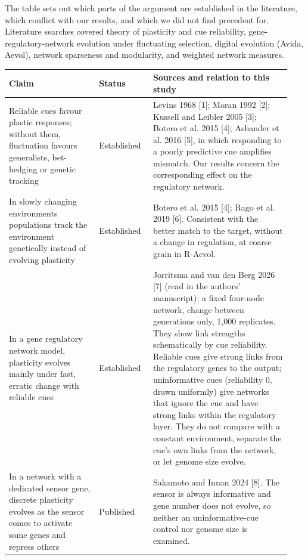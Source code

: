 


The table sets out which parts of the argument are established in the
literature, which conflict with our results, and which we did not find
precedent for. Literature searches covered theory of plasticity and cue
reliability, gene-regulatory-network evolution under fluctuating selection,
digital evolution (Avida, Aevol), network sparseness and modularity, and weighted
network measures.

\begin{longtable}{@{}p{0.3\linewidth}p{0.18\linewidth}p{0.46\linewidth}@{}}
\toprule
Claim & Status & Sources and relation to this study\\
\midrule
\endhead
Reliable cues favour plastic responses; without them, fluctuation favours
generalists, bet-hedging or genetic tracking & Established &
Levins 1968 [1]; Moran 1992 [2]; Kussell and Leibler 2005 [3]; Botero et al.
2015 [4]; Ashander et al. 2016 [5], in which responding to a poorly predictive
cue amplifies mismatch. Our results concern the corresponding effect on the
regulatory network.\\
In slowly changing environments populations track the environment genetically
instead of evolving plasticity & Established & Botero et al. 2015 [4]; Rago et al.
2019 [6]. Consistent with the better match to the target, without a change in
regulation, at coarse grain in R-Aevol.\\
In a gene regulatory network model, plasticity evolves mainly under fast, erratic
change with reliable cues & Established & Jorritsma and van den Berg 2026 [7]
(read in the authors' manuscript): a fixed four-node network, change between
generations only, 1,000 replicates. They show link strengths schematically by cue
reliability. Reliable cues give strong links from the regulatory genes to the
output; uninformative cues (reliability 0, drawn uniformly) give networks that
ignore the cue and have strong links within the regulatory layer. They do not
compare with a constant environment, separate the cue's own links from the
network, or let genome size evolve.\\
In a network with a dedicated sensor gene, discrete plasticity evolves as the
sensor comes to activate some genes and repress others & Published & Sakamoto and
Innan 2024 [8]. The sensor is always informative and gene number does not
evolve, so neither an uninformative-cue control nor genome size is examined.

\end{longtable}
